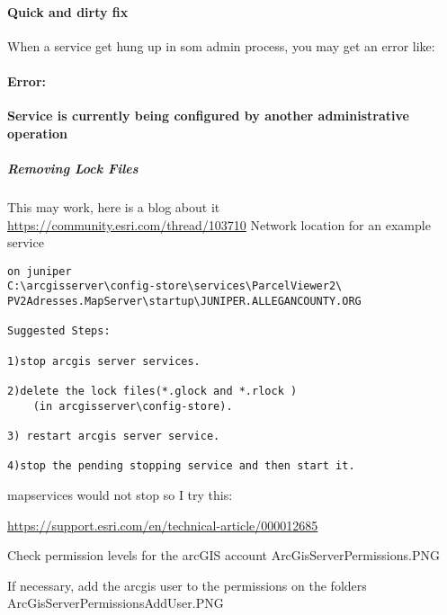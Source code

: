 \clearpage


\paragraph*{Quick and dirty fix\texorpdfstring{\\}{}}

\noindent When a service get hung up in som admin process, you may get an error like:
\paragraph*{Error: \texorpdfstring{\\}{}}
\noindent \textbf{Service is currently being configured by another administrative operation}
\subparagraph[Remove Lock Files]{Removing Lock Files \texorpdfstring{\\}{}}
This may work, here is a blog about it\\
\href{https://community.esri.com/thread/103710}{https://community.esri.com/thread/103710}
Network location for an example service\\
\begin{verbatim}
on juniper
C:\arcgisserver\config-store\services\ParcelViewer2\
PV2Adresses.MapServer\startup\JUNIPER.ALLEGANCOUNTY.ORG

Suggested Steps:

1)stop arcgis server services.

2)delete the lock files(*.glock and *.rlock )
    (in arcgisserver\config-store).

3) restart arcgis server service.

4)stop the pending stopping service and then start it.
\end{verbatim}


mapservices would not stop so I try this:


\href{https://support.esri.com/en/technical-article/000012685}{https://support.esri.com/en/technical-article/000012685}


Check permission levels for the arcGIS account
ArcGisServerPermissions.PNG


If necessary, add the arcgis user to the permissions on the folders
ArcGisServerPermissionsAddUser.PNG



